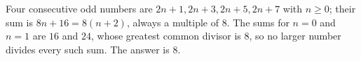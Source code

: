 Four consecutive odd numbers are $2n+1,2n+3,2n+5,2n+7$ with $n\ge0$; their sum is $8n+16=8(n+2)$, always a multiple of $8$. The sums for $n=0$ and $n=1$ are $16$ and $24$, whose greatest common divisor is $8$, so no larger number divides every such sum. The answer is $\boxed{8}$.

